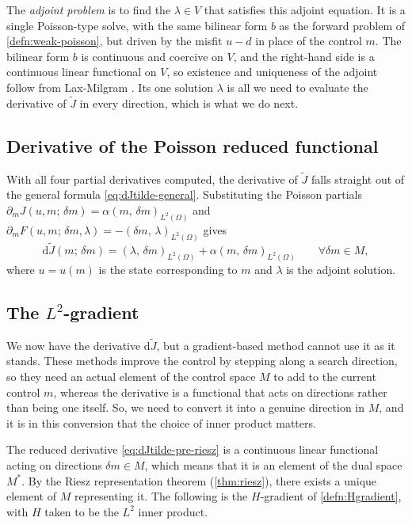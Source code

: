 \documentclass[a4paper,11pt]{article}
\newcommand{\Om}{\Omega}
\newcommand{\Lp}[1]{L^{2}(#1)}              %
\newcommand{\inner}[3]{(#1,\,#2)_{#3}}        %
\newcommand{\Jt}{\tilde{J}}                  %
\newcommand{\Mspace}{M}
\theoremstyle{spacedplain} \newtheorem{theorem}[counter]{Theorem} \newtheorem{lemma}[counter]{Lemma} \newtheorem{prop}[counter]{Proposition} \newtheorem{cor}[counter]{Corollary}
\theoremstyle{spaceddefinition} \newtheorem{defn}[counter]{Definition} \newtheorem{example}[counter]{Example} \newtheorem{remark}[counter]{Remark}
\begin{document}
The \emph{adjoint problem} is to find the $\lambda \in V$ that satisfies this adjoint equation. It is a single Poisson-type solve, with the same bilinear form $b$ as the forward problem of \cref{defn:weak-poisson}, but driven by the misfit $u - d$ in place of the control $m$. The bilinear form $b$ is continuous and coercive on $V$, and the right-hand side is a continuous linear functional on $V$, so existence and uniqueness of the adjoint follow from Lax-Milgram \citep[p.~14]{shfp2017}. Its one solution $\lambda$ is all we need to evaluate the derivative of $\Jt$ in every direction, which is what we do next.

\subsection{Derivative of the Poisson reduced functional}
\label{sec:deriv:reduced} 

With all four partial derivatives computed, the derivative of $\Jt$ falls straight out of the general formula \cref{eq:dJtilde-general}. Substituting the Poisson partials $\partial_m J(u, m;\, \delta m) = \alpha \inner{m}{\delta m}{\Lp{\Om}}$ and $\partial_m F(u, m;\, \delta m, \lambda) = -\inner{\delta m}{\lambda}{\Lp{\Om}}$ gives
\begin{equation}
  \label{eq:dJtilde-pre-riesz}
  \mathrm{d}\Jt(m;\, \delta m)
  = \inner{\lambda}{\delta m}{\Lp{\Om}}
  + \alpha \inner{m}{\delta m}{\Lp{\Om}}
  \qquad \forall \delta m \in \Mspace,
\end{equation}
where $u = u(m)$ is the state corresponding to $m$ and $\lambda$ is the adjoint solution.

\subsection{The \texorpdfstring{$L^2$}{L2}-gradient}
\label{sec:deriv:l2grad}

We now have the derivative $\mathrm{d}\Jt$, but a gradient-based method cannot use it as it stands. These methods improve the control by stepping along a search direction, so they need an actual element of the control space $\Mspace$ to add to the current control $m$, whereas the derivative is a functional that acts on directions rather than being one itself. So, we need to convert it into a genuine direction in $\Mspace$, and it is in this conversion that the choice of inner product matters.

The reduced derivative \cref{eq:dJtilde-pre-riesz} is a continuous linear functional acting on directions $\delta m \in \Mspace$, which means that it is an element of the dual space $\Mspace^{*}$. By the Riesz representation theorem (\cref{thm:riesz}), there exists a unique element of $\Mspace$ representing it. The following is the $H$-gradient of \cref{defn:Hgradient}, with $H$ taken to be the $L^{2}$ inner product.
\end{document}
